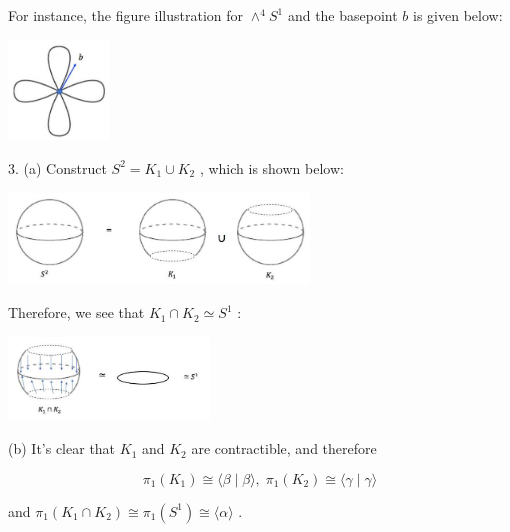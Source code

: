 For instance, the figure illustration for \({ \land  }^{4}{S}^{1}\) and the basepoint \(b\) is given below:

\begin{center}
\includegraphics[max width=0.2\textwidth]{images/bo_d2bcsrref24c73avs720_150_700_767_253_253_0.jpg}
\end{center}
\hspace*{3em} 

3. (a) Construct \({S}^{2} = {K}_{1} \cup  {K}_{2}\) , which is shown below:

\begin{center}
\includegraphics[max width=0.6\textwidth]{images/bo_d2bcsrref24c73avs720_150_424_1213_793_241_0.jpg}
\end{center}
\hspace*{3em} 

Therefore, we see that \({K}_{1} \cap  {K}_{2} \simeq  {S}^{1}\) :

\begin{center}
\includegraphics[max width=0.4\textwidth]{images/bo_d2bcsrref24c73avs720_150_562_1637_540_225_0.jpg}
\end{center}
\hspace*{3em} 

(b) It’s clear that \({K}_{1}\) and \({K}_{2}\) are contractible, and therefore

\[
{\pi }_{1}\left( {K}_{1}\right)  \cong  \langle \beta  \mid  \beta \rangle ,\;{\pi }_{1}\left( {K}_{2}\right)  \cong  \langle \gamma  \mid  \gamma \rangle
\]

and \({\pi }_{1}\left( {{K}_{1} \cap  {K}_{2}}\right)  \cong  {\pi }_{1}\left( {S}^{1}\right)  \cong  \langle \alpha \rangle\) .

